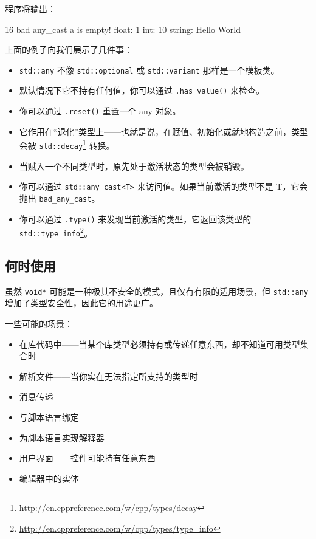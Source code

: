 程序将输出：

\begin{codebox}[cpp]
16
bad any_cast
a is empty!
float: 1
int: 10
string: Hello World
\end{codebox}

上面的例子向我们展示了几件事：
\begin{itemize}
\item \texttt{std::any} 不像 \texttt{std::optional} 或 \texttt{std::variant} 那样是一个模板类。
\item 默认情况下它不持有任何值，你可以通过 \texttt{.has\_value()} 来检查。
\item 你可以通过 \texttt{.reset()} 重置一个 any 对象。
\item 它作用在“退化”类型上——也就是说，在赋值、初始化或就地构造之前，类型会被 \texttt{std::decay}\footnote{\url{http://en.cppreference.com/w/cpp/types/decay}} 转换。
\item 当赋入一个不同类型时，原先处于激活状态的类型会被销毁。
\end{itemize}

\begin{itemize}
\item 你可以通过 \texttt{std::any\_cast<T>} 来访问值。如果当前激活的类型不是 T，它会抛出 \texttt{bad\_any\_cast}。
\item 你可以通过 \texttt{.type()} 来发现当前激活的类型，它返回该类型的 \texttt{std::type\_info}\footnote{\url{http://en.cppreference.com/w/cpp/types/type_info}}。
\end{itemize}


\subsection{何时使用}

虽然 \texttt{void*} 可能是一种极其不安全的模式，且仅有有限的适用场景，但 \texttt{std::any} 增加了类型安全性，因此它的用途更广。

一些可能的场景：
\begin{itemize}
\item 在库代码中——当某个库类型必须持有或传递任意东西，却不知道可用类型集合时
\item 解析文件——当你实在无法指定所支持的类型时
\item 消息传递
\item 与脚本语言绑定
\item 为脚本语言实现解释器
\item 用户界面——控件可能持有任意东西
\item 编辑器中的实体
\end{itemize}

